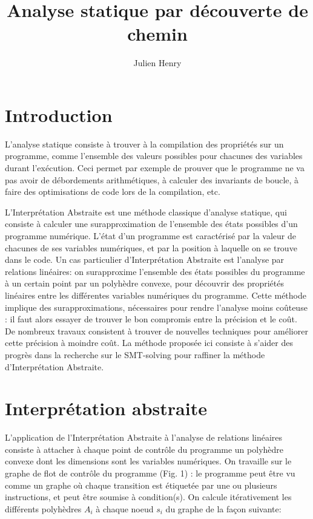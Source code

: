\documentclass{llncs}
\title{Analyse statique par découverte de chemin}
\subtitle{}
\author{Julien Henry}
\institute{CNRS - Verimag \\ \email{Julien.Henry@imag.fr}}
\begin{document}
\maketitle

\section{Introduction}

L'analyse statique consiste à trouver à la compilation des propriétés sur un
programme, comme l'ensemble des valeurs possibles pour chacunes des
variables durant l'exécution. Ceci permet par exemple de prouver que le
programme ne va pas avoir de débordements arithmétiques, à calculer des
invariants de boucle, à faire des optimisations de code lors de la compilation, etc.

L'Interprétation Abstraite est une méthode classique d'analyse statique, qui consiste à calculer une surapproximation de
l'ensemble des états possibles d'un programme numérique. 
L'état d'un programme est caractérisé par la valeur de chacunes de ses variables
numériques, et par la position à laquelle on se trouve dans le code.
Un cas particulier
d'Interprétation Abstraite est l'analyse par relations linéaires: on surapproxime
l'ensemble des états possibles du programme à un certain point par un polyhèdre convexe, pour découvrir des propriétés linéaires entre les différentes variables
numériques du programme.
Cette méthode implique des surapproximations, nécessaires pour rendre
l'analyse moins coûteuse : il faut alors essayer de
trouver le bon compromis entre la précision et le coût. De nombreux travaux
consistent à trouver de nouvelles techniques pour améliorer cette précision à
moindre coût. La méthode proposée ici consiste à s'aider des
progrès dans la recherche sur le SMT-solving
pour raffiner la méthode
d'Interprétation Abstraite.

\section{Interprétation abstraite}

L'application de l'Interprétation Abstraite à l'analyse de
relations linéaires consiste à attacher à chaque point de contrôle du programme un polyhèdre convexe dont les dimensions sont les variables numériques. On travaille sur
le graphe de flot de contrôle du programme (Fig. 1) : le programme peut
être vu comme un graphe où chaque transition est étiquetée par une ou plusieurs
instructions, et peut être soumise à condition(s). On calcule itérativement les
différents polyhèdres $A_i$ à chaque noeud $s_i$ du graphe de la façon suivante:
\end{document}
